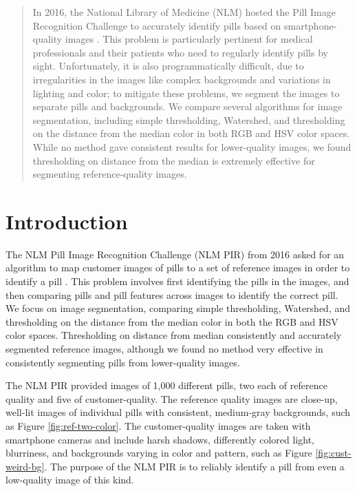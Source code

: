 \documentclass{article}
\begin{document}

\begin{abstract}
In 2016, the National Library of Medicine (NLM) hosted the Pill Image Recognition Challenge to accurately identify pills based on smartphone-quality images \cite{PIR}. This problem is particularly pertinent for medical professionals and their patients who need to regularly identify pills by sight. Unfortunately, it is also programmatically difficult, due to irregularities in the images like complex backgrounds and variations in lighting and color; to mitigate these problems, we segment the images to separate pills and backgrounds. We compare several algorithms for image segmentation, including simple thresholding, Watershed, and thresholding on the distance from the median color in both RGB and HSV color spaces. While no method gave consistent results for lower-quality images, we found thresholding on distance from the median is extremely effective for segmenting reference-quality images.
\end{abstract}

\section{Introduction}
\label{introduction}

The NLM Pill Image Recognition Challenge (NLM PIR) from 2016 asked for an algorithm to 
map customer images of pills to a set of reference images in order to identify a pill \cite{PIR}. This problem involves first identifying the pills in the images, and then comparing pills and pill features across images to identify the correct pill. We focus on image segmentation, comparing simple thresholding, Watershed, and thresholding on the distance from the median color in both the RGB and HSV color spaces. Thresholding on distance from median consistently and accurately segmented reference images, although we found no method very effective in consistently segmenting pills from lower-quality images.

The NLM PIR provided images of 1,000 different pills, two each of reference quality and five of customer-quality. The reference quality images are close-up, well-lit images of individual pills with consistent, medium-gray backgrounds, such as Figure \ref{fig:ref-two-color}. The customer-quality images are taken with smartphone cameras and include harsh shadows, differently colored light, blurriness, and backgrounds varying in color and pattern, such as Figure \ref{fig:cust-weird-bg}. The purpose of the NLM PIR is to reliably identify a pill from even a low-quality image of this kind.
\end{document}
